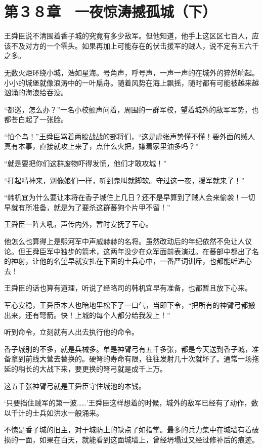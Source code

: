\section{第３８章　一夜惊涛撼孤城（下）}

王舜臣说不清围着香子城的究竟有多少敌军。但他知道，他手上这区区七百人，应该不及对方的一个零头。如果再加上可能存在的伏击援军的贼人，说不定有五六千之多。

无数火炬环绕小城，浩如星海。号角声，呼号声，一声一声的在城外的猝然响起。小小的城堡就像浪涛中的一叶扁舟。随着风势在海上飘摇，随时都有可能被越来越汹涌的海浪给吞没。

“都巡，怎么办？”一名小校颤声问着，周围的一群军校，望着城外的敌军军势，也都苍白起了一张脸。

“怕个鸟！”王舜臣骂着两股战战的部将们，“这是虚张声势懂不懂！要外面的贼人真有本事，直接就攻上来了，点什么火把，嫌着家里油多吗？”

“就是要把你们这群废物吓得发慌，他们才敢攻城！”

“打起精神来，别像娘们一样，听到鬼叫就脚软。守过这一夜，援军就来了！”

“韩机宜为什么要让本将在香子城住上几日？还不是早算到了贼人会来偷袭！一切早就有所准备，就是为了要杀这群蕃狗个片甲不留！”

王舜臣一阵大吼，声传内外，暂时安抚了军心。

他怎么也算得上是熙河军中声威赫赫的名将。虽然改动后的年纪依然不免让人议论。但王舜臣军中独步的箭术，这两年没少在众军面前表演过。在蕃部中都出了名的神射，让他的名望早就安扎在下面的士兵心中，一番严词训斥，也都能听进心去！

王舜臣的话也算有道理，听说了经略司的韩机宜早有准备，也都暂且放下心来。

军心安稳，王舜臣本人也暗地里松下了一口气，当即下令，“把所有的神臂弓都搬出来，还有弩箭。快！上城的每个人都分给我发上！”

听到命令，立刻就有人出去执行他的命令。

香子城别的不多，就是兵械多。单是神臂弓有五千多张，都是今天送到香子城，准备拿到前线大营去替换的。硬弩的寿命有限，往往发射几十次就坏了。通常一场拖延的稍长的大战下来，要更换的弩弓就是成千上万。

这五千张神臂弓就是王舜臣守住城池的本钱。

‘只要挡住贼军的第一波……’王舜臣这样想着的时候，城外的敌军已经有了动作，数以千计的士兵如洪水一般涌来。

不愧是香子城的旧主，对于城防上的缺点了如指掌。最多的兵力集中在城墙有着破损的一面，如果在白天，就能看到这面城墙上，曾经坍塌过又经过修补后的痕迹。

